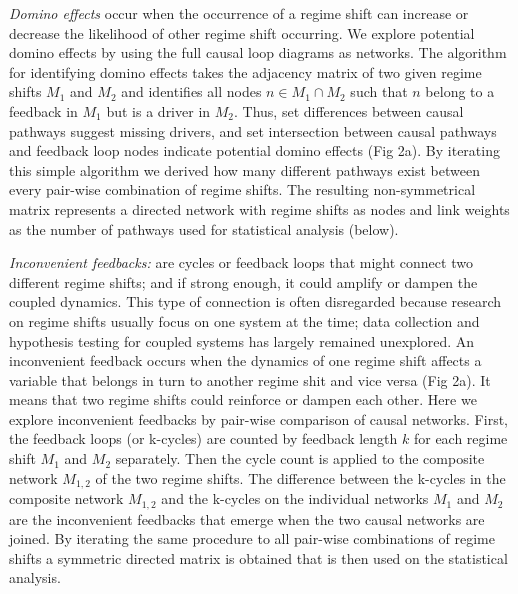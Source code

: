 \documentclass[9pt,]{article}
\begin{document}
\emph{Domino effects} occur when the occurrence of a regime shift can
increase or decrease the likelihood of other regime shift occurring. We
explore potential domino effects by using the full causal loop diagrams
as networks. The algorithm for identifying domino effects takes the
adjacency matrix of two given regime shifts \(M_1\) and \(M_2\) and
identifies all nodes \(n \in M_1 \cap M_2\) such that \(n\) belong to a
feedback in \(M_1\) but is a driver in \(M_2\). Thus, set differences
between causal pathways suggest missing drivers, and set intersection
between causal pathways and feedback loop nodes indicate potential
domino effects (Fig 2a). By iterating this simple algorithm we derived
how many different pathways exist between every pair-wise combination of
regime shifts. The resulting non-symmetrical matrix represents a
directed network with regime shifts as nodes and link weights as the
number of pathways used for statistical analysis (below).

\emph{Inconvenient feedbacks:} are cycles or feedback loops that might
connect two different regime shifts; and if strong enough, it could
amplify or dampen the coupled dynamics. This type of connection is often
disregarded because research on regime shifts usually focus on one
system at the time; data collection and hypothesis testing for coupled
systems has largely remained unexplored. An inconvenient feedback occurs
when the dynamics of one regime shift affects a variable that belongs in
turn to another regime shit and vice versa (Fig 2a). It means that two
regime shifts could reinforce or dampen each other. Here we explore
inconvenient feedbacks by pair-wise comparison of causal networks.
First, the feedback loops (or k-cycles) are counted by feedback length
\(k\) for each regime shift \(M_1\) and \(M_2\) separately. Then the
cycle count is applied to the composite network \(M_{1,2}\) of the two
regime shifts. The difference between the k-cycles in the composite
network \(M_{1,2}\) and the k-cycles on the individual networks \(M_1\)
and \(M_2\) are the inconvenient feedbacks that emerge when the two
causal networks are joined. By iterating the same procedure to all
pair-wise combinations of regime shifts a symmetric directed matrix is
obtained that is then used on the statistical analysis.
\end{document}
